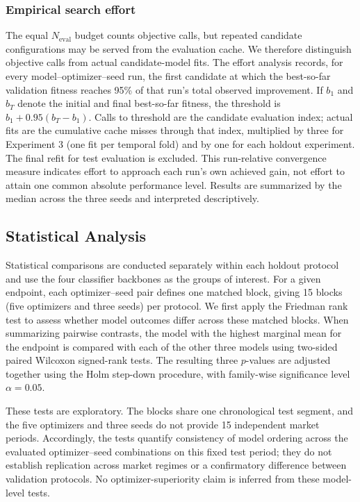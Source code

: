 \subsubsection{Empirical search effort}
\label{sec:empirical_effort}
The equal $N_{\mathrm{eval}}$ budget counts objective calls, but repeated candidate configurations may be served from the evaluation cache. We therefore distinguish objective calls from actual candidate-model fits. The effort analysis records, for every model--optimizer--seed run, the first candidate at which the best-so-far validation fitness reaches 95\% of that run's total observed improvement. If $b_1$ and $b_T$ denote the initial and final best-so-far fitness, the threshold is $b_1+0.95(b_T-b_1)$. Calls to threshold are the candidate evaluation index; actual fits are the cumulative cache misses through that index, multiplied by three for Experiment 3 (one fit per temporal fold) and by one for each holdout experiment. The final refit for test evaluation is excluded. This run-relative convergence measure indicates effort to approach each run's own achieved gain, not effort to attain one common absolute performance level. Results are summarized by the median across the three seeds and interpreted descriptively.

\subsection{Statistical Analysis}
\label{sec:statistical_analysis}

Statistical comparisons are conducted separately within each holdout protocol and use the four classifier backbones as the groups of interest. For a given endpoint, each optimizer--seed pair defines one matched block, giving 15 blocks (five optimizers and three seeds) per protocol. We first apply the Friedman rank test to assess whether model outcomes differ across these matched blocks. When summarizing pairwise contrasts, the model with the highest marginal mean for the endpoint is compared with each of the other three models using two-sided paired Wilcoxon signed-rank tests. The resulting three $p$-values are adjusted together using the Holm step-down procedure, with family-wise significance level $\alpha=0.05$.

These tests are exploratory. The blocks share one chronological test segment, and the five optimizers and three seeds do not provide 15 independent market periods. Accordingly, the tests quantify consistency of model ordering across the evaluated optimizer--seed combinations on this fixed test period; they do not establish replication across market regimes or a confirmatory difference between validation protocols. No optimizer-superiority claim is inferred from these model-level tests.
